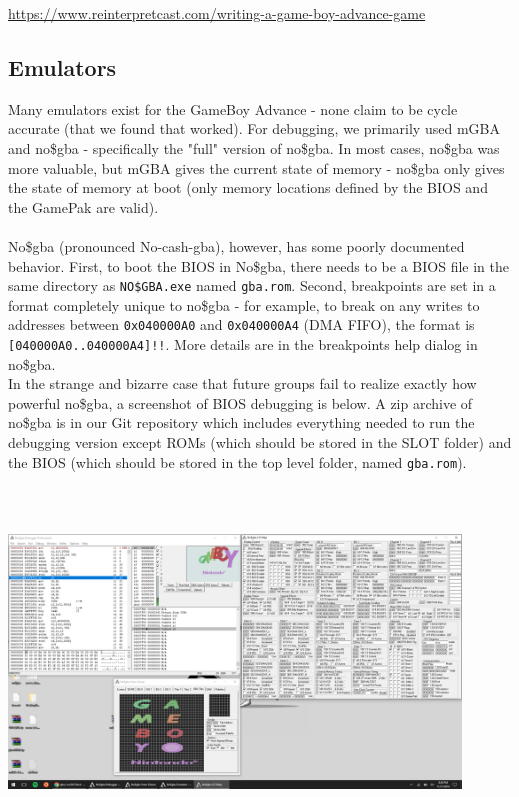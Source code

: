 \documentclass[11pt,a4paper]{article}
\begin{document}
	\url{https://www.reinterpretcast.com/writing-a-game-boy-advance-game}
	 
	\subsection{Emulators}
	Many emulators exist for the GameBoy Advance - none claim to be cycle accurate (that we found that worked). For debugging, we primarily used mGBA and no\$gba - specifically the "full" version of no\$gba. In most cases, no\$gba was more valuable, but mGBA gives the current state of memory - no\$gba only gives the state of memory at boot (only memory locations defined by the BIOS and the GamePak are valid).\\\\
	No\$gba (pronounced No-cash-gba), however, has some poorly documented behavior. First, to boot the BIOS in No\$gba, there needs to be a BIOS file in the same directory as \texttt{NO\$GBA.exe} named \texttt{gba.rom}. Second, breakpoints are set in a format completely unique to no\$gba - for example, to break on any writes to addresses between \texttt{0x040000A0} and \texttt{0x040000A4} (DMA FIFO), the format is \texttt{[040000A0..040000A4]!!}. More details are in the breakpoints help dialog in no\$gba.\\
	In the strange and bizarre case that future groups fail to realize exactly how powerful no\$gba, a screenshot of BIOS debugging is below. A zip archive of no\$gba is in our Git repository which includes everything needed to run the debugging version except ROMs (which should be stored in the SLOT folder) and the BIOS (which should be stored in the top level folder, named \texttt{gba.rom}).\\
	\includegraphics[width=12cm, height=10cm, keepaspectratio=true]{nogba}
	
\end{document}
